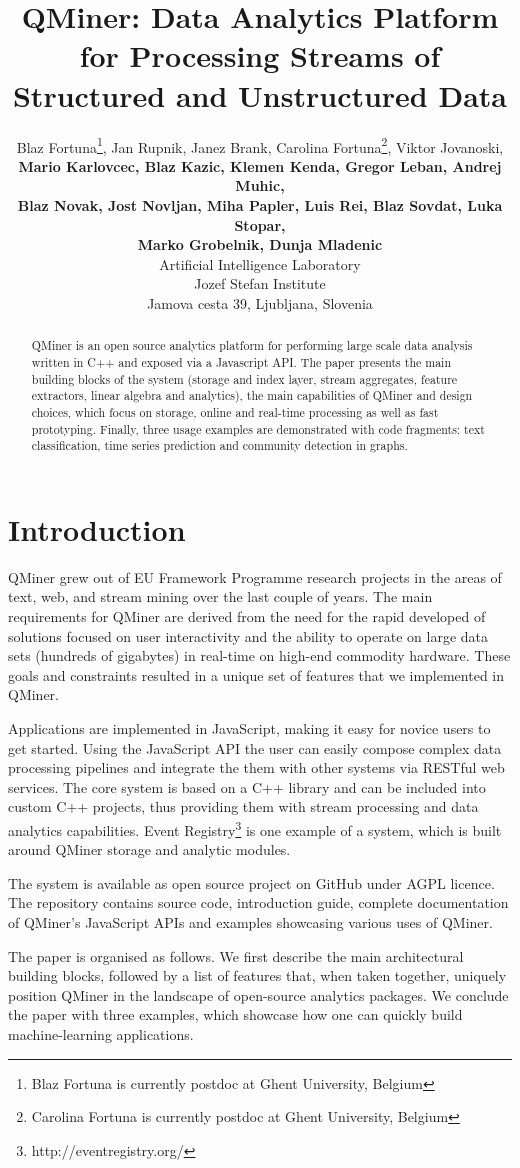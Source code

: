 \documentclass{article} %
\title{QMiner: Data Analytics Platform for Processing Streams of Structured and Unstructured Data}
\author{
Blaz Fortuna\thanks{Blaz Fortuna is currently postdoc at Ghent University, Belgium}, Jan Rupnik, Janez Brank, Carolina Fortuna\thanks{Carolina Fortuna is currently postdoc at Ghent University, Belgium}, Viktor Jovanoski, \\
\textbf{Mario Karlovcec, Blaz Kazic, Klemen Kenda, Gregor Leban, Andrej Muhic,} \\
\textbf{Blaz Novak, Jost Novljan, Miha Papler, Luis Rei, Blaz Sovdat, Luka Stopar,} \\
\textbf{Marko Grobelnik, Dunja Mladenic} \\
Artificial Intelligence Laboratory \\
Jozef Stefan Institute \\
Jamova cesta 39, Ljubljana, Slovenia \\
}
\begin{document}
\maketitle

\begin{abstract}
QMiner is an open source analytics platform for performing large scale data analysis written in C++ and exposed via a Javascript API. The paper presents the main building blocks of the system (storage and index layer, stream aggregates, feature extractors, linear algebra and analytics), the main capabilities of QMiner and design choices, which focus on storage, online and real-time processing as well as fast prototyping. Finally, three usage examples are demonstrated with code fragments: text classification, time series prediction and community detection in graphs.\end{abstract}

\section{Introduction}
QMiner grew out of EU Framework Programme research projects in the areas of text, web, and stream mining over the last couple of years. The main requirements for QMiner are derived from the need for the rapid developed of solutions focused on user interactivity and the ability to operate on large data sets (hundreds of gigabytes) in real-time on high-end commodity hardware. These goals and constraints resulted in a unique set of features that we implemented in QMiner.

Applications are implemented in JavaScript, making it easy for novice users to get started. Using the JavaScript API the user can easily compose complex data processing pipelines and integrate the them with other systems via RESTful web services. The core system is based on a C++ library and can be included into custom C++ projects, thus providing them with stream processing and data analytics capabilities. Event Registry\footnote{http://eventregistry.org/}\cite{eventRegistry} is one example of a system, which is built around QMiner storage and analytic modules.

The system is available as open source project on GitHub under AGPL licence. The repository contains source code, introduction guide, complete documentation of QMiner's JavaScript APIs and examples showcasing various uses of QMiner.

The paper is organised as follows. We first describe the main architectural building blocks, followed by a list of features that, when taken together, uniquely position QMiner in the landscape of open-source analytics packages. We conclude the paper with three examples, which showcase how one can quickly build machine-learning applications.
\end{document}
